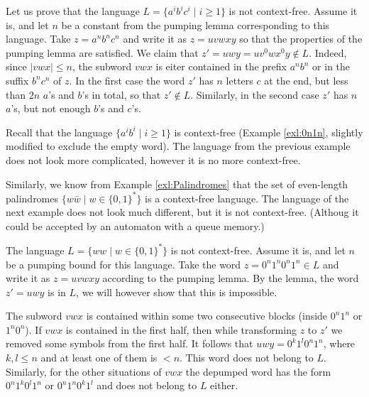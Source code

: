 \begin{page}

\begin{exl}
Let us prove that the language $L = \{a^ib^ic^i \mid i \ge 1\}$ is not context-free.
Assume it is, and let $n$ be a constant from the pumping lemma corresponding to this language.
Take $z = a^nb^nc^n$ and write it as $z = uvwxy$ so that the properties of the pumping lemma are satisfied.
We claim that $z' = uwy = uv^0wx^0y \notin L$.
Indeed, since $|vwx| \le n$, the subword $vwx$ is eiter contained in the prefix $a^nb^n$ or in the suffix $b^nc^n$ of $z$.
In the first case the word $z'$ has $n$ letters $c$ at the end, but less than $2n$ $a$'s and $b$'s in total, so that $z' \notin L$.
Similarly, in the second case $z'$ has $n$ $a$'s, but not enough $b$'s and $c$'s.
\end{exl}

\end{page}

\begin{page}


Recall that the language $\{a^ib^i \mid i \ge 1\}$ is context-free (Example \ref{exl:0n1n}, slightly modified to exclude the empty word).
The language from the previous example does not look more complicated, however it is no more context-free.

Similarly, we know from Example \ref{exl:Palindromes} that the set of even-length palindromes $\{w \bar{w} \mid w \in \{0,1\}^*\}$
is a context-free language.
The language of the next example does not look much different, but it is not context-free.
(Althoug it could be accepted by an automaton with a queue memory.)


\end{page}

\begin{page}

\begin{exl}
\label{exl:WW}
The language $L = \{ww \mid w \in \{0,1\}^*\}$ is not context-free.
Assume it is, and let $n$ be a pumping bound for this language.
Take the word $z = 0^n1^n0^n1^n \in L$ and write it as $z = uvwxy$ according to the pumping lemma.
By the lemma, the word $z' = uwy$ is in $L$, we will however show that this is impossible.

The subword $vwx$ is contained within some two consecutive blocks (inside $0^n1^n$ or $1^n0^n$).
If $vwx$ is contained in the first half, then while transforming $z$ to $z'$ we removed some symbols from the first half.
It follows that $uwy = 0^k1^l0^n1^n$, where $k, l \le n$ and at least one of them is $<n$.
This word does not belong to $L$.
Similarly, for the other situations of $vwx$ the depumped word has the form $0^n1^k0^l1^n$ or $0^n1^n0^k1^l$ and does not belong to $L$ either.
\end{exl}

\end{page}

